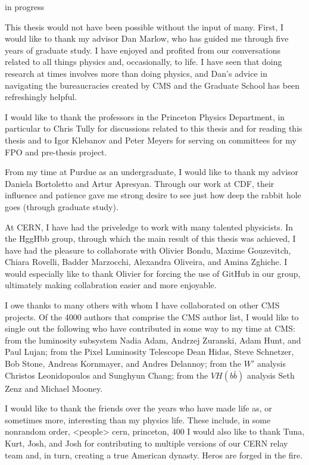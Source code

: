 in progress

This thesis would not have been possible without the input of many.
First, I would like to thank my advisor Dan Marlow, who has guided me through five years of
graduate study. I have enjoyed and profited from our conversations related
to all things physics and, occasionally, to life. I have seen that doing research at times involves
more than doing physics, and Dan's advice in navigating the bureaucracies created by
CMS and the Graduate School has been refreshingly helpful.

I would like to thank the professors in the Princeton Physics Department, in particular to Chris Tully
for discussions related to this thesis and for reading this thesis and to Igor Klebanov
and Peter Meyers for serving on committees for my FPO and pre-thesis project.

From my time at Purdue as an undergraduate, I would like to thank my advisor Daniela Bortoletto and
Artur Apresyan. Through our work at CDF, their influence and patience gave me strong desire to
see just how deep the rabbit hole goes (through graduate study).

At CERN, I have had the priveledge to work with many talented physicists. In the HggHbb group,
through which the main result of this thesis was achieved, I have had the pleasure to collaborate with
Olivier Bondu, Maxime Gouzevitch, Chiara Rovelli, Badder Marzocchi, Alexandra Oliveira, and
Amina Zghiche. I would especially like to thank Olivier for forcing the use of GitHub in our group,
ultimately making collabration easier and more enjoyable.

I owe thanks to many others with whom I have collaborated on other CMS projects.
Of the 4000 authors that comprise the CMS author list, I would like to single out the following
who have contributed in some way to my time at CMS:
from the luminosity subsystem Nadia Adam, Andrzej Zuranski, Adam Hunt, and Paul Lujan;
from the Pixel Luminosity Telescope Dean Hidas, Steve Schnetzer, Bob Stone, Andreas Kornmayer, and Andres Delannoy;
from the $W'$ analysis Christos Leonidopoulos and Sunghyun Chang;
from the $VH(b\bar{b})$ analysis Seth Zenz and Michael Mooney.

I would like to thank the friends over the years who have made life as, or sometimes more, interesting
than my physics life. These include, in some nonrandom order,
<people> cern, princeton, 400
I would also like to thank Tuna, Kurt, Josh, and Josh for contributing to multiple versions
of our CERN relay team and, in turn, creating a true American dynasty. Heros are forged in the fire.

